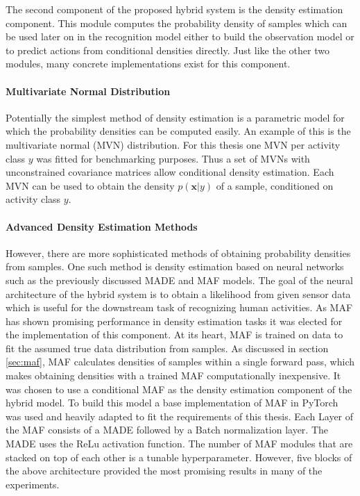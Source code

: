 \documentclass[11pt,titlepage,oneside,openany]{book}
\begin{document}
The second component of the proposed hybrid system is the density estimation component. This module computes the probability density of samples which can be used later on in the recognition model either to build the observation model or to predict actions from conditional densities directly. Just like the other two modules, many concrete implementations exist for this component.

\paragraph{Multivariate Normal Distribution}
Potentially the simplest method of density estimation is a parametric model for which the probability densities can be computed easily. An example of this is the multivariate normal (MVN) distribution. For this thesis one MVN per activity class $y$ was fitted for benchmarking purposes. Thus a set of MVNs with unconstrained covariance matrices allow conditional density estimation. Each MVN can be used to obtain the density $p(\pmb{x}|y)$ of a sample, conditioned on activity class $y$.

\paragraph{Advanced Density Estimation Methods}
However, there are more sophisticated methods of obtaining probability densities from samples. One such method is density estimation based on neural networks such as the previously discussed MADE and MAF models. The goal of the neural architecture of the hybrid system is to obtain a likelihood from given sensor data which is useful for the downstream task of recognizing human activities. As MAF has shown promising performance in density estimation tasks \cite{kobyzev_normalizing_2021} it was elected for the implementation of this component. At its heart, MAF is trained on data to fit the assumed true data distribution from samples. As discussed in section \ref{sec:maf}, MAF calculates densities of samples within a single forward pass, which makes obtaining densities with a trained MAF computationally inexpensive. It was chosen to use a conditional MAF as the density estimation component of the hybrid model. To build this model a base implementation of MAF in PyTorch \cite{kostrikov_pytorch-flows_2022} was used and heavily adapted to fit the requirements of this thesis. Each Layer of the MAF consists of a MADE followed by a Batch normalization layer. The MADE uses the ReLu activation function. The number of MAF modules that are stacked on top of each other is a tunable hyperparameter. However, five blocks of the above architecture provided the most promising results in many of the experiments.
\end{document}
